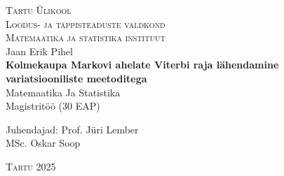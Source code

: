 \begin{titlepage}
\begin{center}

\textsc{\large{Tartu Ülikool}}\\
\textsc{Loodus- ja täppisteaduste valdkond}\\
\textsc{Matemaatika ja statistika instituut}\\[5.5cm]

{\large Jaan Erik Pihel}\\
{\Large\bfseries Kolmekaupa Markovi ahelate Viterbi raja lähendamine variatsiooniliste meetoditega}\\
Matemaatika Ja Statistika\\
Magistritöö ($30$ EAP)\\

{\hfill Juhendajad: Prof. Jüri Lember}\\
{\hfill MSc. Oskar Soop}


\textsc{Tartu 2025}
\end{center}
\end{titlepage}